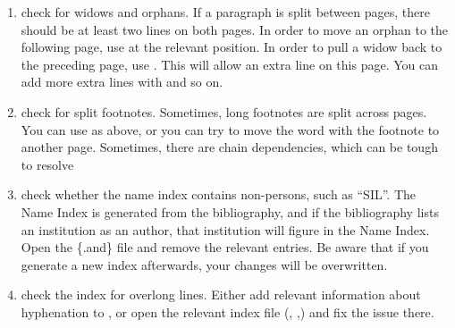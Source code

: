 \begin{enumerate}
\item check for widows and orphans. If a paragraph is split between pages, there should be at least two lines on both pages. In order to move  an orphan to the following page, use  at the relevant position. In order to pull a widow back to the preceding page, use . This will allow an extra line on this page. You can add more extra lines with  and so on.  
\item check for split footnotes. Sometimes, long footnotes are split across pages. You can use  as above, or you can try to move the word with the footnote to another page. Sometimes, there are chain dependencies, which can be tough to resolve
\item check whether the name index contains non-persons, such as ``SIL''. The Name Index is generated from the bibliography, and if the bibliography lists an institution as an author, that institution will figure in the Name Index. Open the \computer\{.and\} file and remove the relevant entries. Be aware that if you generate a new index afterwards, your changes will be overwritten. 
\item check the index for overlong lines. Either add relevant information about hyphenation to , or open the relevant index file (, ,) and fix the issue there.  
\end{enumerate} 